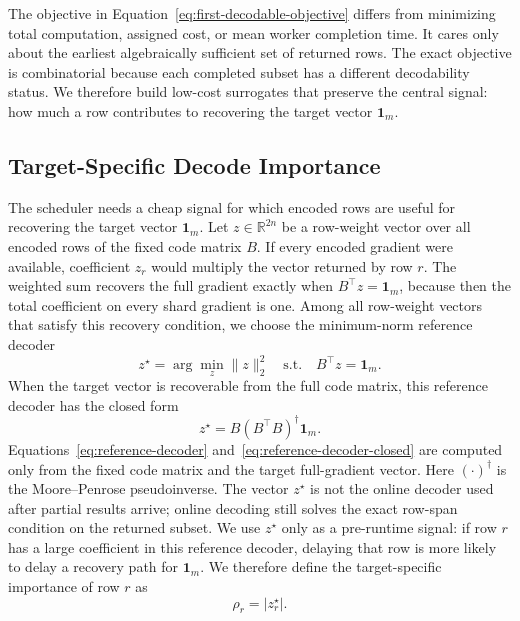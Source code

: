 The objective in Equation~\eqref{eq:first-decodable-objective} differs from
minimizing total computation, assigned cost, or mean worker completion time.
It cares only about the earliest algebraically
sufficient set of returned rows.  The exact objective is combinatorial because
each completed subset has a different decodability status.  We therefore build
low-cost surrogates that preserve the central signal: how much a row
contributes to recovering the target vector $\mathbf{1}_m$.

\subsection{Target-Specific Decode Importance}

The scheduler needs a cheap signal for which encoded rows are useful for
recovering the target vector $\mathbf{1}_m$.  Let
$z\in\mathbb{R}^{2n}$ be a row-weight vector over all encoded rows of the fixed
code matrix $B$.  If every encoded gradient were available, coefficient $z_r$
would multiply the vector returned by row $r$.  The weighted sum recovers the
full gradient exactly when $B^\top z=\mathbf{1}_m$, because then the total
coefficient on every shard gradient is one.  Among all row-weight vectors that
satisfy this recovery condition, we choose the minimum-norm reference decoder
\begin{equation}
  \label{eq:reference-decoder}
  z^\star =
  \arg\min_z \|z\|_2^2
  \quad \mathrm{s.t.} \quad
  B^\top z = \mathbf{1}_m .
\end{equation}
When the target vector is recoverable from the full code matrix, this reference
decoder has the closed form
\begin{equation}
  \label{eq:reference-decoder-closed}
  z^\star = B(B^\top B)^\dagger \mathbf{1}_m .
\end{equation}
Equations~\eqref{eq:reference-decoder}
and~\eqref{eq:reference-decoder-closed} are computed only from the fixed code
matrix and the target full-gradient vector.  Here $(\cdot)^\dagger$ is the
Moore--Penrose pseudoinverse.  The vector
$z^\star$ is not the online decoder used after partial results arrive; online
decoding still solves the exact row-span condition on the returned subset.  We
use $z^\star$ only as a pre-runtime signal: if row $r$ has a large coefficient
in this reference decoder, delaying that row is more likely to delay a recovery
path for $\mathbf{1}_m$.  We therefore define the target-specific importance of
row $r$ as
\begin{equation}
  \label{eq:row-importance}
  \rho_r = |z^\star_r|.
\end{equation}


